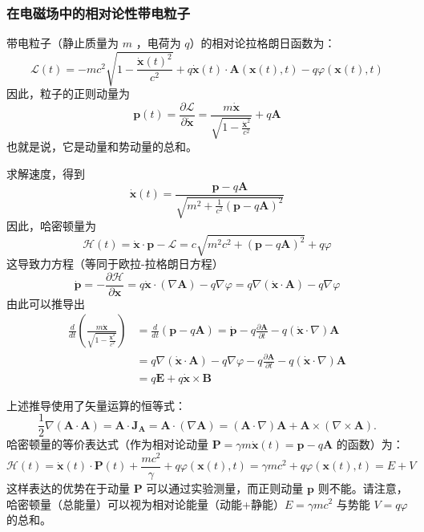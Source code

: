 \subsubsection{在电磁场中的相对论性带电粒子}
带电粒子（静止质量为 \( m \) ，电荷为 \( q \)）的相对论拉格朗日函数为：
\[
\mathcal{L}(t) = -mc^2 \sqrt{1 - \frac{\dot{\mathbf{x}}(t)^2}{c^2}} + q \dot{\mathbf{x}}(t) \cdot \mathbf{A}(\mathbf{x}(t), t) - q \varphi(\mathbf{x}(t), t)~
\]
因此，粒子的正则动量为
\[
\mathbf{p}(t) = \frac{\partial \mathcal{L}}{\partial \dot{\mathbf{x}}} = \frac{m \dot{\mathbf{x}}}{\sqrt{1 - \frac{\dot{\mathbf{x}}^2}{c^2}}} + q \mathbf{A}~
\]
也就是说，它是动量和势动量的总和。

求解速度，得到
\[
\dot{\mathbf{x}}(t) = \frac{\mathbf{p} - q \mathbf{A}}{\sqrt{m^2 + \frac{1}{c^2} (\mathbf{p} - q \mathbf{A})^2}}~
\]
因此，哈密顿量为
\[
\mathcal{H}(t) = \dot{\mathbf{x}} \cdot \mathbf{p} - \mathcal{L} = c \sqrt{m^2 c^2 + (\mathbf{p} - q \mathbf{A})^2} + q \varphi~
\]
这导致力方程（等同于欧拉-拉格朗日方程）
\[
\dot{\mathbf{p}} = -\frac{\partial \mathcal{H}}{\partial \mathbf{x}} = q \dot{\mathbf{x}} \cdot (\nabla \mathbf{A}) - q \nabla \varphi = q \nabla (\dot{\mathbf{x}} \cdot \mathbf{A}) - q \nabla \varphi~
\]
由此可以推导出 
\begin{equation}
\begin{aligned}
\frac{d}{dt} \left( \frac{m \dot{\mathbf{x}}}{\sqrt{1 - \frac{\dot{\mathbf{x}}^2}{c^2}}} \right) &= \frac{d}{dt} (\mathbf{p} - q \mathbf{A}) = \dot{\mathbf{p}} - q \frac{\partial \mathbf{A}}{\partial t} - q (\dot{\mathbf{x}} \cdot \nabla) \mathbf{A}\\
&= q \nabla (\dot{\mathbf{x}} \cdot \mathbf{A}) - q \nabla \varphi - q \frac{\partial \mathbf{A}}{\partial t} - q (\dot{\mathbf{x}} \cdot \nabla) \mathbf{A}\\
&= q \mathbf{E} + q \dot{\mathbf{x}} \times \mathbf{B}
\end{aligned}~
\end{equation} 

上述推导使用了矢量运算的恒等式：
\[
\frac{1}{2} \nabla (\mathbf{A} \cdot \mathbf{A}) = \mathbf{A} \cdot \mathbf{J}_{\mathbf{A}} = \mathbf{A} \cdot (\nabla \mathbf{A}) = (\mathbf{A} \cdot \nabla) \mathbf{A} + \mathbf{A} \times (\nabla \times \mathbf{A}).~
\]
哈密顿量的等价表达式（作为相对论动量 \( \mathbf{P} = \gamma m \dot{\mathbf{x}}(t) = \mathbf{p} - q \mathbf{A} \) 的函数）为：
\[
\mathcal{H}(t) = \dot{\mathbf{x}}(t) \cdot \mathbf{P}(t) + \frac{mc^2}{\gamma} + q \varphi(\mathbf{x}(t), t) = \gamma mc^2 + q \varphi(\mathbf{x}(t), t) = E + V~
\]
这样表达的优势在于动量 \( \mathbf{P} \) 可以通过实验测量，而正则动量 \( \mathbf{p} \) 则不能。请注意，哈密顿量（总能量）可以视为相对论能量（动能+静能）\( E = \gamma mc^2 \) 与势能 \( V = q \varphi \) 的总和。
